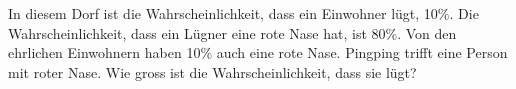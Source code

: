 In diesem Dorf ist die Wahrscheinlichkeit, dass ein Einwohner lügt, 10\%.
Die Wahrscheinlichkeit, dass ein Lügner eine rote Nase hat, ist 80\%.
Von den ehrlichen Einwohnern haben 10\% auch eine rote Nase.
Pingping trifft eine Person mit roter Nase.
Wie gross ist die Wahrscheinlichkeit, dass sie lügt?


\begin{loesung}
\end{loesung}
